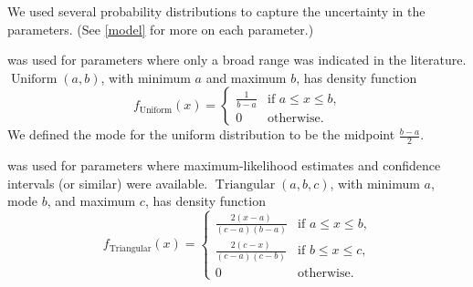 \documentclass{article}
\DeclareMathOperator{\Uniform}{Uniform}
\DeclareMathOperator{\Triangular}{Triangular}
\begin{document}
We used several probability distributions to capture the uncertainty
in the parameters.  (See \autoref{model} for more on each parameter.)
\begin{description}[labelsep=0.6ex]
\item[Uniform] was used for parameters where only a broad range was
  indicated in the literature.  $\Uniform(a, b)$, with minimum $a$ and
  maximum $b$, has density function
  \begin{equation}
    \label{uniform}
    f_{\Uniform}(x) =
    \begin{cases}
      \frac{1}{b - a} & \text{if $a \leq x \leq b$,}
      \\
      0 & \text{otherwise.}
    \end{cases}
  \end{equation}
  We defined the mode for the uniform distribution to be the midpoint
  $\frac{b - a}{2}$.

\item [Triangular] was used for parameters where maximum-likelihood
  estimates and confidence intervals (or similar) were available.
  $\Triangular(a, b, c)$, with minimum $a$, mode $b$, and maximum $c$,
  has density function
  \begin{equation}
    \label{triangular}
    f_{\Triangular}(x) =
    \begin{cases}
      \frac{2 (x - a)}{(c - a)(b - a)} & \text{if $a \leq x \leq b$,}
      \\
      \frac{2 (c - x)}{(c - a)(c - b)} & \text{if $b \leq x \leq c$,}
      \\
      0 & \text{otherwise.}
    \end{cases}
  \end{equation}


\end{description}
\end{document}
